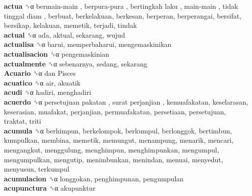 \textbf{actua} ␝α   bermain-main ,  berpura-pura ,  bertingkah laku ,  main-main ,  tidak tinggal diam , berbuat, berkelakuan, berkesan, berperan, berperangai, bersifat, bersikap, kelakuan, memetik, terjadi, tindak  \\
\textbf{actual} ␝α  ada, aktual, sekarang, wujud  \\
\textbf{actualisa} ␝α  barui, memperbaharui, mengemaskinikan  \\
\textbf{actualisacion} ␝α  pengemaskinian  \\
\textbf{actualmente} ␝α  sebenarnya, sedang, sekarang  \\
\textbf{Acuario} ␝α   dan Pisces   \\
\textbf{acuatico} ␝α  air, akuatik  \\
\textbf{acudi} ␝α  hadiri, menghadiri  \\
\textbf{acuerdo} ␝α   persetujuan pakatan ,  surat perjanjian , kemuafakatan, keselarasan, keserasian, muafakat, perjanjian, permuafakatan, persetiaan, persetujuan, traktat, triti  \\
\textbf{acumula} ␝α  berhimpun, berkelompok, berkumpul, berlonggok, bertimbun, kumpulkan, membina, memetik, memungut, menampung, menarik, mencari, mengangkut, menggulung, menghimpun, menghimpunkan, mengumpul, mengumpulkan, mengutip, menimbunkan, menindan, menuai, menyedut, menyusun, terkumpul  \\
\textbf{acumulacion} ␝α  longgokan, penghimpunan, pengumpulan  \\
\textbf{acupunctura} ␝α  akupunktur  \\
